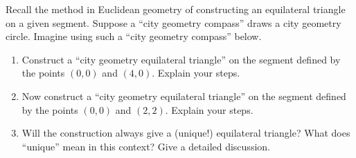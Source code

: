 %

\begin{prob} 
Recall the method in Euclidean geometry of constructing an equilateral triangle on a given segment.  Suppose a ``city geometry compass'' draws a city geometry circle.  Imagine using such a ``city geometry compass'' below.  
\begin{enumerate}
\item Construct a ``city geometry equilateral triangle'' on the segment defined by the
  points $(0,0)$ and $(4,0)$. Explain your steps.
\item Now construct a ``city geometry equilateral triangle'' on the segment defined by the
  points $(0,0)$ and $(2,2)$. Explain your steps.
\item Will the construction always give a (unique!) equilateral triangle? What does ``unique'' mean in this context? Give a detailed discussion.  
\end{enumerate}
\end{prob} 



